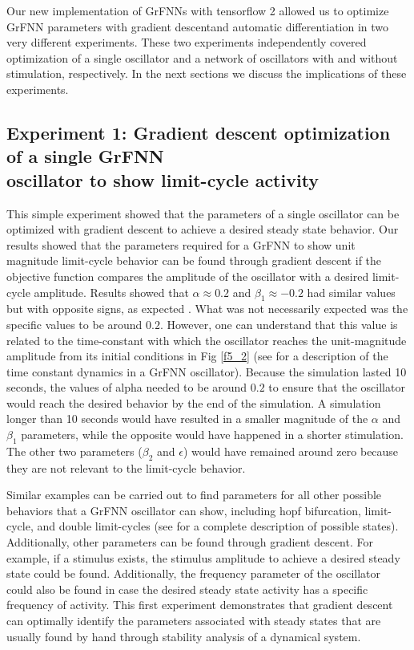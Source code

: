 \documentclass{report}
\begin{document}
Our new implementation of GrFNNs with tensorflow 2 allowed us to optimize GrFNN parameters with gradient descentand automatic differentiation in two very different experiments. These two experiments independently covered optimization of a single oscillator and a network of oscillators with and without stimulation, respectively. In the next sections we discuss the implications of these experiments.

\subsection{Experiment 1: Gradient descent optimization of a single GrFNN \\ oscillator to show limit-cycle activity} 


This simple experiment showed that the parameters of a single oscillator can be optimized with gradient descent to achieve a desired steady state behavior. Our results showed that the parameters required for a GrFNN to show unit magnitude limit-cycle behavior can be found through gradient descent if the objective function compares the amplitude of the oscillator with a desired limit-cycle amplitude. Results showed that $\alpha \approx 0.2$ and $\beta_1 \approx -0.2$ had similar values but with opposite signs, as expected \cite{kim2015signal}. What was not necessarily expected was the specific values to be around $0.2$. However, one can understand that this value is related to the time-constant with which the oscillator reaches the unit-magnitude amplitude from its initial conditions in Fig \ref{f5_2} (see \cite{kim2015signal} for a description of the time constant dynamics in a GrFNN oscillator). Because the simulation lasted 10 seconds, the values of alpha needed to be around $0.2$ to ensure that the oscillator would reach the desired behavior by the end of the simulation. A simulation longer than 10 seconds would have resulted in a smaller magnitude of the $\alpha$ and $\beta_1$ parameters, while the opposite would have happened in a shorter stimulation. The other two parameters ($\beta_2$ and $\epsilon$) would have remained around zero because they are not relevant to the limit-cycle behavior.

Similar examples can be carried out to find parameters for all other possible behaviors that a GrFNN oscillator can show, including hopf bifurcation, limit-cycle, and double limit-cycles (see \cite{kim2015signal} for a complete description of possible states). Additionally, other parameters can be found through gradient descent. For example, if a stimulus exists, the stimulus amplitude to achieve a desired steady state could be found. Additionally, the frequency parameter of the oscillator could also be found in case the desired steady state activity has a specific frequency of activity. This first experiment demonstrates that gradient descent can optimally identify the parameters associated with steady states that are usually found by hand through stability analysis of a dynamical system. 
\end{document}
